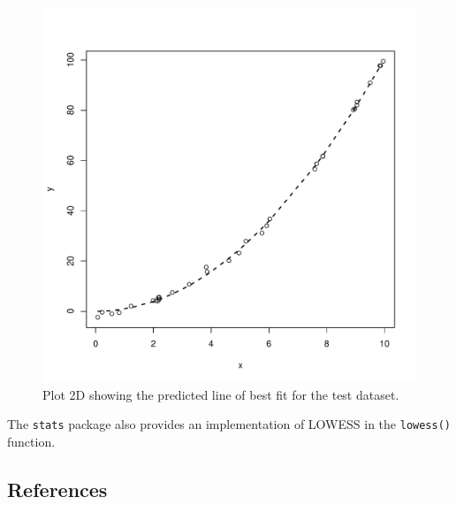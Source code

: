 \begin{figure}[htp]
\centering
\includegraphics[scale=0.45]{a_regression/locally_estimated_scatterplot_smoothing_result.pdf}
\caption{Plot 2D showing the predicted line of best fit for the test dataset.}
\label{plot:locally_estimated_scatterplot_smoothing_result}
\end{figure}

The \texttt{stats} package also provides an implementation of LOWESS in the \texttt{lowess()} function.

\subsection{References}

